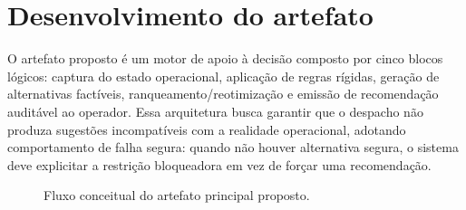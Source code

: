 \documentclass[
  12pt,
  oneside,
  a4paper,
  sumario=tradicional,
  brazil
]{abntex2}
\begin{document}
\chapter{Desenvolvimento do artefato}
O artefato proposto \'e um motor de apoio \`a decis\~ao composto por cinco blocos l\'ogicos: captura do estado operacional, aplica\c{c}\~ao de regras r\'igidas, gera\c{c}\~ao de alternativas fact\'iveis, ranqueamento/reotimiza\c{c}\~ao e emiss\~ao de recomenda\c{c}\~ao audit\'avel ao operador. Essa arquitetura busca garantir que o despacho n\~ao produza sugest\~oes incompat\'iveis com a realidade operacional, adotando comportamento de falha segura: quando n\~ao houver alternativa segura, o sistema deve explicitar a restri\c{c}\~ao bloqueadora em vez de for\c{c}ar uma recomenda\c{c}\~ao.

\begin{figure}[H]
\centering
{}
\caption{Fluxo conceitual do artefato principal proposto.}
\end{figure}
\end{document}
